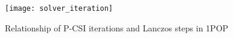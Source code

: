 

\begin {figure}[!t]
\centering
\texttt{[image: solver\_iteration]}
\caption []{Relationship of P-CSI iterations and Lanczos steps in 1\degree POP \label {fig:iter}}
\end {figure}

